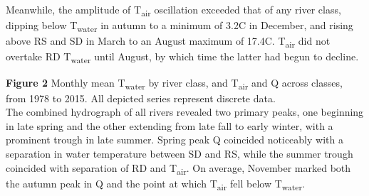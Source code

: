\documentclass[notitlepage]{article}
\begin{document}
Meanwhile, the amplitude of T\textsubscript{air} oscillation exceeded that of any river class, dipping below T\textsubscript{water} in autumn to a minimum of 3.2\degree C in December, and rising above RS and SD in March to an August maximum of 17.4\degree C. T\textsubscript{air} did not overtake RD T\textsubscript{water} until August, by which time the latter had begun to decline.

\begin{center}
\end{center}

\noindent
\textbf{Figure 2} Monthly mean T\textsubscript{water} by river class, and T\textsubscript{air} and Q across classes, from 1978 to 2015. All depicted series represent discrete data. %
\\[\baselineskip]

The combined hydrograph of all rivers revealed two primary peaks, one beginning in late spring and the other extending from late fall to early winter, with a prominent trough in late summer. Spring peak Q coincided noticeably with a separation in water temperature between SD and RS, while the summer trough coincided with separation of RD and T\textsubscript{air}. On average, November marked both the autumn peak in Q and the point at which T\textsubscript{air} fell below T\textsubscript{water}.
\end{document}
